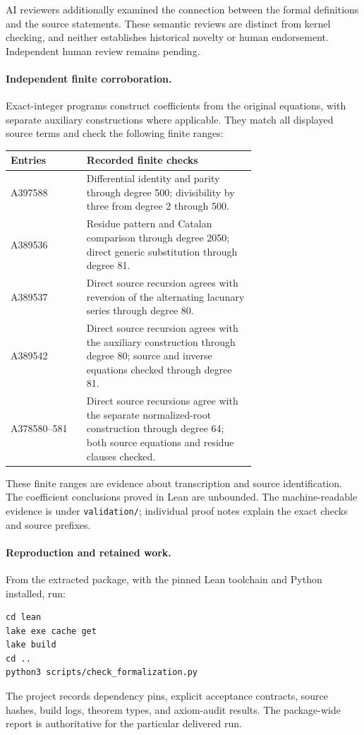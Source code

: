 \documentclass[11pt,a4paper]{article}
\theoremstyle{remark}
\begin{document}
AI reviewers additionally examined the connection between the formal
definitions and the source statements. These semantic reviews are distinct
from kernel checking, and neither establishes historical novelty or human
endorsement. Independent human review remains pending.

\paragraph{Independent finite corroboration.}
Exact-integer programs construct coefficients from the original equations,
with separate auxiliary constructions where applicable. They match all
displayed source terms and check the following finite ranges:

\begin{center}\small
\begin{tabular}{@{}lp{0.69\linewidth}@{}}
\toprule
Entries & Recorded finite checks\\
\midrule
A397588 & Differential identity and parity through degree 500;
  divisibility by three from degree 2 through 500.\\
A389536 & Residue pattern and Catalan comparison through degree 2050;
  direct generic substitution through degree 81.\\
A389537 & Direct source recursion agrees with reversion of the
  alternating lacunary series through degree 80.\\
A389542 & Direct source recursion agrees with the auxiliary
  construction through degree 80; source and inverse equations
  checked through degree 81.\\
A378580--581 & Direct source recursions agree with the separate
  normalized-root construction through degree 64; both source
  equations and residue clauses checked.\\
\bottomrule
\end{tabular}
\end{center}

These finite ranges are evidence about transcription and source
identification. The coefficient conclusions proved in Lean are unbounded.
The machine-readable evidence is under \texttt{validation/}; individual
proof notes explain the exact checks and source prefixes.

\paragraph{Reproduction and retained work.}
From the extracted package, with the pinned Lean toolchain and Python
installed, run:
\begin{verbatim}
cd lean
lake exe cache get
lake build
cd ..
python3 scripts/check_formalization.py
\end{verbatim}
The project records dependency pins, explicit acceptance contracts,
source hashes, build logs, theorem types, and axiom-audit results.
The package-wide report is authoritative for the particular delivered run.
\end{document}
